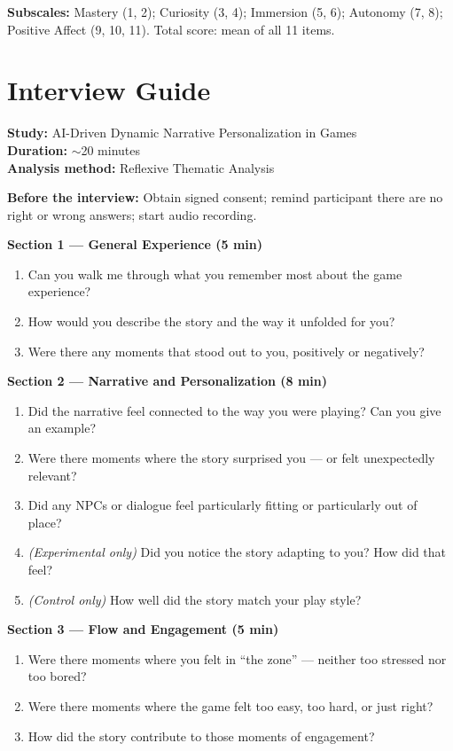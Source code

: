 \documentclass[12pt,a4paper]{report}
\begin{document}
\textbf{Subscales:} Mastery (1, 2); Curiosity (3, 4); Immersion (5, 6); Autonomy (7, 8); Positive Affect (9, 10, 11). Total score: mean of all 11 items.


\chapter{Interview Guide}
\label{app:interview}

\textbf{Study:} AI-Driven Dynamic Narrative Personalization in Games \\
\textbf{Duration:} $\sim$20 minutes \\
\textbf{Analysis method:} Reflexive Thematic Analysis \citep{braun2022thematic}

\textbf{Before the interview:} Obtain signed consent; remind participant there are no right or wrong answers; start audio recording.

\vspace{0.5cm}
\textbf{Section 1 --- General Experience (5 min)}
\begin{enumerate}
\item Can you walk me through what you remember most about the game experience?
\item How would you describe the story and the way it unfolded for you?
\item Were there any moments that stood out to you, positively or negatively?
\end{enumerate}

\textbf{Section 2 --- Narrative and Personalization (8 min)}
\begin{enumerate}[resume]
\item Did the narrative feel connected to the way you were playing? Can you give an example?
\item Were there moments where the story surprised you --- or felt unexpectedly relevant?
\item Did any NPCs or dialogue feel particularly fitting or particularly out of place?
\item \textit{(Experimental only)} Did you notice the story adapting to you? How did that feel?
\item \textit{(Control only)} How well did the story match your play style?
\end{enumerate}

\textbf{Section 3 --- Flow and Engagement (5 min)}
\begin{enumerate}[resume]
\item Were there moments where you felt in ``the zone'' --- neither too stressed nor too bored?
\item Were there moments where the game felt too easy, too hard, or just right?
\item How did the story contribute to those moments of engagement?
\end{enumerate}
\end{document}
